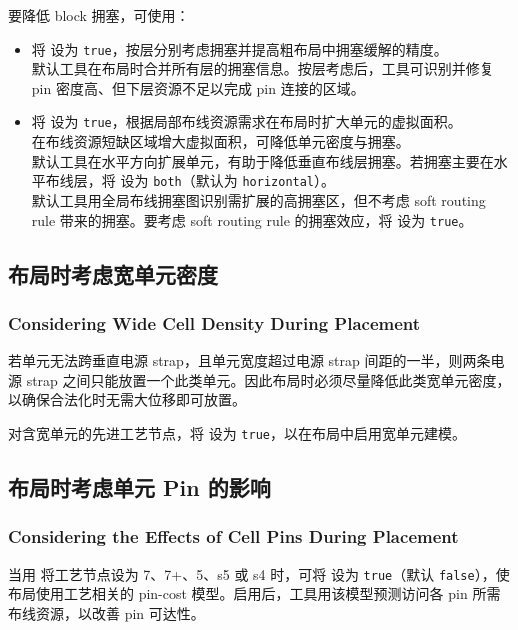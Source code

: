 要降低 block 拥塞，可使用：
\begin{itemize}
  \item 将  设为 \texttt{true}，按层分别考虑拥塞并提高粗布局中拥塞缓解的精度。\\
        默认工具在布局时合并所有层的拥塞信息。按层考虑后，工具可识别并修复 pin 密度高、但下层资源不足以完成 pin 连接的区域。
  \item 将  设为 \texttt{true}，根据局部布线资源需求在布局时扩大单元的虚拟面积。\\
        在布线资源短缺区域增大虚拟面积，可降低单元密度与拥塞。\\
        默认工具在水平方向扩展单元，有助于降低垂直布线层拥塞。若拥塞主要在水平布线层，将  设为 \texttt{both}（默认为 \texttt{horizontal}）。\\
        默认工具用全局布线拥塞图识别需扩展的高拥塞区，但不考虑 soft routing rule 带来的拥塞。要考虑 soft routing rule 的拥塞效应，将  设为 \texttt{true}。
\end{itemize}

\subsection{布局时考虑宽单元密度}
\subsubsection*{Considering Wide Cell Density During Placement}

若单元无法跨垂直电源 strap，且单元宽度超过电源 strap 间距的一半，则两条电源 strap 之间只能放置一个此类单元。因此布局时必须尽量降低此类宽单元密度，以确保合法化时无需大位移即可放置。

对含宽单元的先进工艺节点，将  设为 \texttt{true}，以在布局中启用宽单元建模。

\subsection{布局时考虑单元 Pin 的影响}
\subsubsection*{Considering the Effects of Cell Pins During Placement}

当用  将工艺节点设为 7、7+、5、s5 或 s4 时，可将  设为 \texttt{true}（默认 \texttt{false}），使布局使用工艺相关的 pin-cost 模型。启用后，工具用该模型预测访问各 pin 所需布线资源，以改善 pin 可达性。

